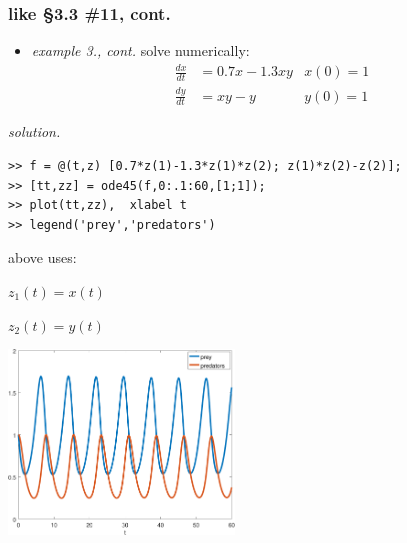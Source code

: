 \documentclass[urlcolor=blue,dvipsnames]{beamer}
\begin{document}
\begin{frame}[fragile]
\frametitle{like \S3.3 \#11, cont.}

\begin{itemize}
\item \emph{example 3., cont.}  solve numerically:
\begin{align*}
\frac{dx}{dt} &= 0.7 x - 1.3 xy & x(0)=1\\
\frac{dy}{dt} &= xy - y  & y(0)=1
\end{align*}
\end{itemize}

\vspace{-2mm}
\noindent \emph{solution.}
\begin{Verbatim}[fontsize=\small]
>> f = @(t,z) [0.7*z(1)-1.3*z(1)*z(2); z(1)*z(2)-z(2)];
>> [tt,zz] = ode45(f,0:.1:60,[1;1]);
>> plot(tt,zz),  xlabel t
>> legend('prey','predators')
\end{Verbatim}

\bigskip
above uses:

$z_1(t)=x(t)$

$z_2(t)=y(t)$

\vspace{-22mm}
\hfill \includegraphics[width=0.45\textwidth]{figs/lotka-time}
\end{frame}
\end{document}

